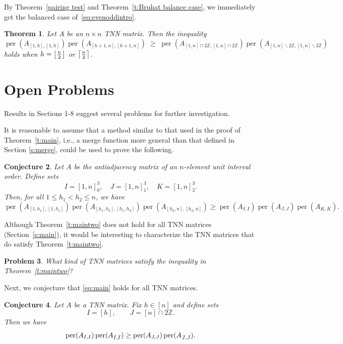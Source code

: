 \documentclass[12pt]{amsart}
\DeclarePairedDelimiter\ceil{\lceil}{\rceil}
\DeclarePairedDelimiter\floor{\lfloor}{\rfloor}
\newtheorem{thm}{Theorem}[section]
\newtheorem{conj}[thm]{Conjecture}
\newtheorem{prob}[thm]{Problem}
\theoremstyle{definition}
\numberwithin{equation}{section}
\DeclareMathOperator{\perm}{per}
\newcommand{\ssm}{\smallsetminus}
\begin{document}
By Theorem~\ref{pairing test} and Theorem~\ref{t:Bruhat balance case}, we immediately get the balanced case of~\eqref{eq:evenoddintro}.

\begin{thm}
    Let $A$ be an $n \times n$ TNN matrix. Then the inequality
    \begin{equation*}
        \perm(A_{[1,h],[1,h]}) \perm(A_{[h+1,n],[h+1,n]}) \;\geq\;
    \perm(A_{[1,n] \cap 2\mathbb Z, [1,n] \cap 2\mathbb Z})
    \perm(A_{[1,n] \ssm 2\mathbb Z, [1,n] \ssm 2\mathbb Z})
    \end{equation*}
    holds when $h = \floor*{\tfrac{n}{2}}$ or $\ceil*{\tfrac{n}{2}}$.
\end{thm}

\section{Open Problems}\label{s:open}

Results in Sections 1-8 suggest several problems for further investigation.

It is reasonable to assume that a method similar to that used in the proof of
Theorem~\ref{t:main}, i.e.,
a merge function more general than that defined in Section \ref{s:merge}, could be used to prove the following.
\begin{conj}
    Let $A$ be the antiadjacency matrix of an $n$-element unit interval order. Define sets
    \begin{equation*}
    I= [1,n]_0^3, \quad J = [1,n]_1^3, \quad K = [1,n]_2^3.
    \end{equation*}
    Then, for all $1\leq h_1 < h_2 \leq n$, we have
    \begin{equation*}
        \perm(A_{[1,h_1],[1,h_1]}) \perm(A_{[h_1,h_2],[h_1,h_2]}) \perm(A_{[h_2,n],[h_2,n]}) \geq \perm(A_{I,I}) \perm(A_{J,J}) \perm(A_{K,K}).
    \end{equation*}
\end{conj}

Although Theorem~\ref{t:maintwo} does not hold for
all TNN matrices (Section~\ref{s:main}), it would be interesting to characterize the TNN matrices that do satisfy Theorem~\ref{t:maintwo}.

\begin{prob}
    What kind of TNN matrices satisfy the inequality in Theorem~\ref{t:maintwo}?
\end{prob}

Next, we conjecture that \eqref{eq:main} holds for all TNN matrices.
\begin{conj}
    Let $A$ be a TNN matrix.
  Fix $h \in [n]$ and define sets
  \begin{equation*}
      I = [h] ,\qquad
      J = [n] \cap 2 \mathbb Z.
  \end{equation*}
  Then we have
  \begin{equation*}
    \perm(A_{I,I})\perm(A_{\Bar I, \Bar I}) \geq \perm(A_{J,J})\perm(A_{\Bar J, \Bar J}).
  \end{equation*}
\end{conj}
\end{document}
